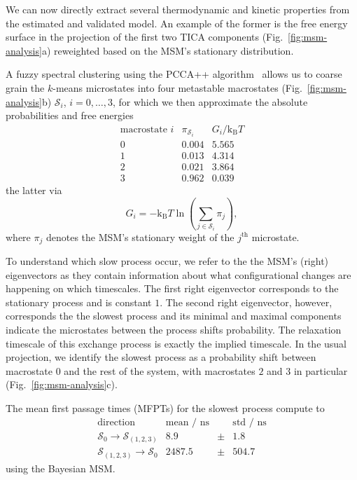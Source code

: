\documentclass[9pt,tutorial]{livecoms}
\begin{document}
We can now directly extract several thermodynamic and kinetic properties from the estimated and validated model. An example of the former is the free energy surface in the projection of the first two TICA components (Fig.~\ref{fig:msm-analysis}a) reweighted based on the MSM's stationary distribution.

A fuzzy spectral clustering using the PCCA++ algorithm~\cite{pcca++} allows us to coarse grain the $k$-means microstates into four metastable macrostates (Fig.~\ref{fig:msm-analysis}b) $\mathcal{S}_i$, $i=0,\dots,3$, for which we then approximate the absolute probabilities and free energies
\[ \begin{array}{ccc}
\textrm{macrostate } i & \pi_{\mathcal{S}_i} & G_i / \textrm{k}_\textrm{B} T \\
\hline
0 & 0.004 & 5.565 \\
1 & 0.013 & 4.314 \\
2 & 0.021 & 3.864 \\
3 & 0.962 & 0.039
\end{array}\]
the latter via
\begin{equation}
\label{eq:fe}
G_i = - \textrm{k}_\textrm{B} T \ln\left(\sum\limits_{j\in \mathcal{S}_i} \pi_j\right),
\end{equation}
where $\pi_j$ denotes the MSM's stationary weight of the $j^\textrm{th}$ microstate.

To understand which slow process occur, we refer to the the MSM's (right) eigenvectors as they contain information about what configurational changes are happening on which timescales. The first right eigenvector corresponds to the stationary process and is constant $1$. The second right eigenvector, however, corresponds the the slowest process and its minimal and maximal components indicate the microstates between the process shifts probability. The relaxation timescale of this exchange process is exactly the implied timescale. In the usual projection, we identify the slowest process as a probability shift between macrostate $0$ and the rest of the system, with macrostates $2$ and $3$ in particular (Fig.~\ref{fig:msm-analysis}c).

The mean first passage times (MFPTs) for the slowest process compute to
\[ \begin{array}{crcr}
\textrm{direction} & \textrm{mean / ns} && \textrm{std / ns} \\
\hline
\mathcal{S}_0 \to \mathcal{S}_{(1,2,3)} & 8.9 & \pm & 1.8 \\
\mathcal{S}_{(1,2,3)} \to \mathcal{S}_0 & 2487.5 & \pm &  504.7
\end{array}\]
using the Bayesian MSM.
\end{document}
